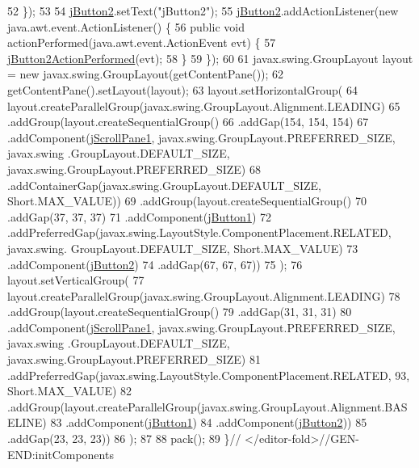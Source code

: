 \begin{DoxyCode}
52         \});
53 
54         \mbox{\hyperlink{class_interfaz_package_1_1_lista_facturas_a099e7867e628d252ed807ea6bd95dea1}{jButton2}}.setText(\textcolor{stringliteral}{"jButton2"});
55         \mbox{\hyperlink{class_interfaz_package_1_1_lista_facturas_a099e7867e628d252ed807ea6bd95dea1}{jButton2}}.addActionListener(\textcolor{keyword}{new} java.awt.event.ActionListener() \{
56             \textcolor{keyword}{public} \textcolor{keywordtype}{void} actionPerformed(java.awt.event.ActionEvent evt) \{
57                 \mbox{\hyperlink{class_interfaz_package_1_1_lista_facturas_a1393fa71e900a876db02c2f07f33f237}{jButton2ActionPerformed}}(evt);
58             \}
59         \});
60 
61         javax.swing.GroupLayout layout = \textcolor{keyword}{new} javax.swing.GroupLayout(getContentPane());
62         getContentPane().setLayout(layout);
63         layout.setHorizontalGroup(
64             layout.createParallelGroup(javax.swing.GroupLayout.Alignment.LEADING)
65             .addGroup(layout.createSequentialGroup()
66                 .addGap(154, 154, 154)
67                 .addComponent(\mbox{\hyperlink{class_interfaz_package_1_1_lista_facturas_a3963a695019cd45a2b9559b6a31530ef}{jScrollPane1}}, javax.swing.GroupLayout.PREFERRED\_SIZE, javax.swing
      .GroupLayout.DEFAULT\_SIZE, javax.swing.GroupLayout.PREFERRED\_SIZE)
68                 .addContainerGap(javax.swing.GroupLayout.DEFAULT\_SIZE, Short.MAX\_VALUE))
69             .addGroup(layout.createSequentialGroup()
70                 .addGap(37, 37, 37)
71                 .addComponent(\mbox{\hyperlink{class_interfaz_package_1_1_lista_facturas_af1f1a335b42683dc72b7096d9c5612b5}{jButton1}})
72                 .addPreferredGap(javax.swing.LayoutStyle.ComponentPlacement.RELATED, javax.swing.
      GroupLayout.DEFAULT\_SIZE, Short.MAX\_VALUE)
73                 .addComponent(\mbox{\hyperlink{class_interfaz_package_1_1_lista_facturas_a099e7867e628d252ed807ea6bd95dea1}{jButton2}})
74                 .addGap(67, 67, 67))
75         );
76         layout.setVerticalGroup(
77             layout.createParallelGroup(javax.swing.GroupLayout.Alignment.LEADING)
78             .addGroup(layout.createSequentialGroup()
79                 .addGap(31, 31, 31)
80                 .addComponent(\mbox{\hyperlink{class_interfaz_package_1_1_lista_facturas_a3963a695019cd45a2b9559b6a31530ef}{jScrollPane1}}, javax.swing.GroupLayout.PREFERRED\_SIZE, javax.swing
      .GroupLayout.DEFAULT\_SIZE, javax.swing.GroupLayout.PREFERRED\_SIZE)
81                 .addPreferredGap(javax.swing.LayoutStyle.ComponentPlacement.RELATED, 93, Short.MAX\_VALUE)
82                 .addGroup(layout.createParallelGroup(javax.swing.GroupLayout.Alignment.BASELINE)
83                     .addComponent(\mbox{\hyperlink{class_interfaz_package_1_1_lista_facturas_af1f1a335b42683dc72b7096d9c5612b5}{jButton1}})
84                     .addComponent(\mbox{\hyperlink{class_interfaz_package_1_1_lista_facturas_a099e7867e628d252ed807ea6bd95dea1}{jButton2}}))
85                 .addGap(23, 23, 23))
86         );
87 
88         pack();
89     \}\textcolor{comment}{// </editor-fold>//GEN-END:initComponents}
\end{DoxyCode}
